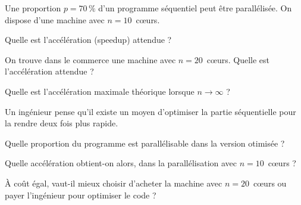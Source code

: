 
\begingroup

\begin{exercice}
  \label{exo:introduction/amdahl}

  Une proportion $p=70\,\%$ d'un programme séquentiel peut être parallélisée. On dispose d'une machine avec $n=10$~c\oe urs.

  \begin{question} 
  \item Quelle est l'accélération (speedup) attendue ?
  \item On trouve dans le commerce une machine avec $n=20$~c\oe urs. Quelle est l'accélération attendue ?
  \item Quelle est l'accélération maximale théorique lorsque $n \to \infty$ ?
  \end{question}

  Un ingénieur pense qu'il existe un moyen d'optimiser la partie séquentielle pour la rendre deux fois plus rapide.

  \begin{question} 
  \item Quelle proportion du programme est parallélisable dans la version otimisée ? 
  \item Quelle accélération obtient-on alors, dans la parallélisation avec $n = 10$~c\oe urs ?
  \item À coût égal, vaut-il mieux choisir d'acheter la machine avec $n=20$~c\oe urs ou payer l'ingénieur pour optimiser le code ? 
  \end{question}
  
\end{exercice}

\endgroup
\endinput
